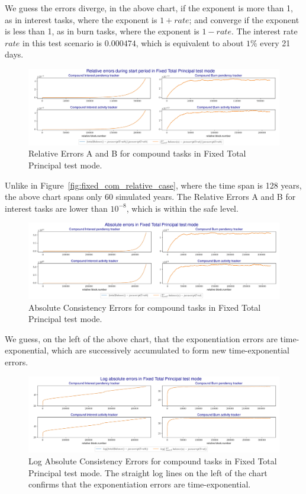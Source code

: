 \documentclass{article}
\begin{document}
We guess the errors diverge, in the above chart, 
if the exponent is more than 1, as in 
interest tasks, where the exponent is $1+rate$; and converge if the 
exponent is less than 1, as in burn tasks, where the exponent is $1-rate$.
The interest rate $rate$ in this test scenario is $0.000474$, which is 
equivalent to about $1 \%$ every 21 days.

\begin{figure}[H]
  \centering
  \includegraphics[width=5.3in]{images/6.3_fixed_com_relative_mid.jpg}
  \caption{Relative Errors A and B for compound tasks 
  in Fixed Total Principal test mode.
  }
  \label{fig:fixed_com_relative_case_mid}
\end{figure}

Unlike in Figure~\ref{fig:fixed_com_relative_case}, where the time span 
is 128 years,
the above chart spans only 60 simulated years.
The Relative Errors A and B for interest tasks 
are lower than $10^{-8}$, which is within the safe level.

\begin{figure}[H]
  \centering
  \includegraphics[width=5.3in]{images/6.3_fixed_com_absolute.jpg}
  \caption{Absolute Consistency Errors for compound tasks 
  in Fixed Total Principal test mode.
  }
  \label{fig:fixed_com_absolute_case}
\end{figure}

We guess, on the left of the above chart, 
that the exponentiation 
errors are time-exponential, which are successively accumulated 
to form new time-exponential errors.

\begin{figure}[H]
  \centering
  \includegraphics[width=5.3in]{images/6.3_fixed_com_absolute_log.jpg}
  \caption{Log Absolute Consistency Errors for compound tasks 
  in Fixed Total Principal test mode. The straight log lines on the left of the 
  chart confirms that the exponentiation errors are time-exponential.
  }
  \label{fig:fixed_com_absolute_log_case}
\end{figure}
\end{document}
